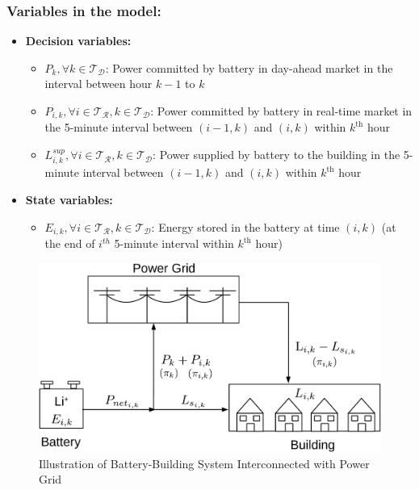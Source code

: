 \documentclass[11pt,twoside]{article}
\begin{document}
\subsubsection{Variables in the model:}
\begin{itemize}
\item \textbf{Decision variables:}
\begin{itemize}
\item[\textbullet] $P_{k}, \forall k \in \mathcal{T_D}$: Power committed by battery in day-ahead market in the interval between hour $k-1$ to $k$
\item[\textbullet] $P_{i,k}, \forall i \in \mathcal{T_R}, k \in \mathcal{T_D}$: Power committed by battery in real-time market in the 5-minute interval between $(i-1,k)$ and $(i,k)$ within $k^\text{th}$ hour
\item[\textbullet] $L^{sup}_{i,k}, \forall i \in \mathcal{T_R}, k \in \mathcal{T_D}$: Power supplied by battery to the building in the 5-minute interval between $(i-1,k)$ and $(i,k)$ within $k^\text{th}$ hour 
\end{itemize}
\item \textbf{State variables:}
\begin{itemize}
\item[\textbullet] $E_{i,k}, \forall i \in \mathcal{T_R}, k \in \mathcal{T_D}$: Energy stored in the battery at time $(i,k)$ (at the end of $i^{th}$ 5-minute interval within $k^\text{th}$ hour) 
\end{itemize}
\end{itemize}
\begin{figure}[h!]
\begin{center}
\includegraphics[scale=0.5]{Figures/system_blocks-crop.pdf} \caption{Illustration of Battery-Building System Interconnected with Power Grid}\label{fig:system}\end{center}
\end{figure}
\FloatBarrier
\end{document}
